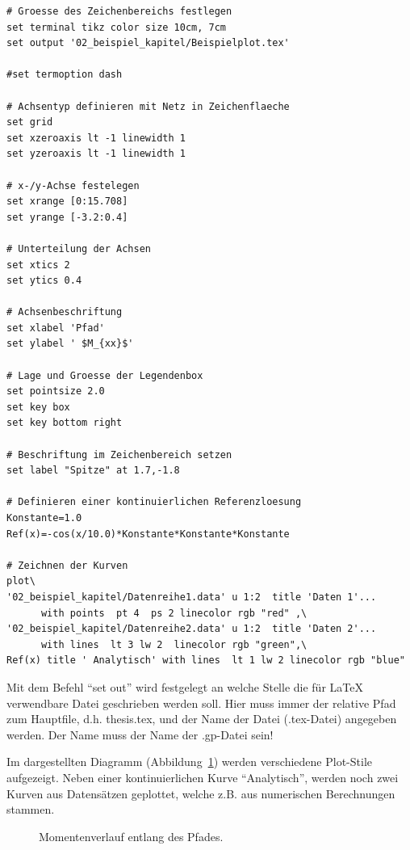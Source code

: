 \begin{verbatim}
# Groesse des Zeichenbereichs festlegen
set terminal tikz color size 10cm, 7cm
set output '02_beispiel_kapitel/Beispielplot.tex'

#set termoption dash

# Achsentyp definieren mit Netz in Zeichenflaeche
set grid
set xzeroaxis lt -1 linewidth 1
set yzeroaxis lt -1 linewidth 1

# x-/y-Achse festelegen
set xrange [0:15.708]
set yrange [-3.2:0.4]

# Unterteilung der Achsen
set xtics 2
set ytics 0.4

# Achsenbeschriftung
set xlabel 'Pfad'
set ylabel ' $M_{xx}$'

# Lage und Groesse der Legendenbox
set pointsize 2.0
set key box
set key bottom right

# Beschriftung im Zeichenbereich setzen
set label "Spitze" at 1.7,-1.8

# Definieren einer kontinuierlichen Referenzloesung
Konstante=1.0
Ref(x)=-cos(x/10.0)*Konstante*Konstante*Konstante

# Zeichnen der Kurven
plot\
'02_beispiel_kapitel/Datenreihe1.data' u 1:2  title 'Daten 1'...
      with points  pt 4  ps 2 linecolor rgb "red" ,\
'02_beispiel_kapitel/Datenreihe2.data' u 1:2  title 'Daten 2'...
      with lines  lt 3 lw 2  linecolor rgb "green",\
Ref(x) title ' Analytisch' with lines  lt 1 lw 2 linecolor rgb "blue"
\end{verbatim}

Mit dem Befehl "`set out"' wird festgelegt an welche Stelle die für \LaTeX
verwendbare Datei geschrieben werden soll.
Hier muss immer der relative Pfad zum Hauptfile, d.h. thesis.tex, und der Name
der Datei (.tex-Datei) angegeben werden.
Der Name muss der Name der .gp-Datei sein!

Im dargestellten Diagramm (Abbildung~\ref{fig:Momentenverlauf}) werden
verschiedene Plot-Stile aufgezeigt. Neben einer kontinuierlichen Kurve
"`Analytisch"', werden noch zwei Kurven aus Datensätzen geplottet, welche z.B.
aus numerischen Berechnungen stammen.


\begin{figure}[t]
  \centering\small
  \caption{Momentenverlauf entlang des Pfades.}
  \label{fig:Momentenverlauf}
\end{figure}

